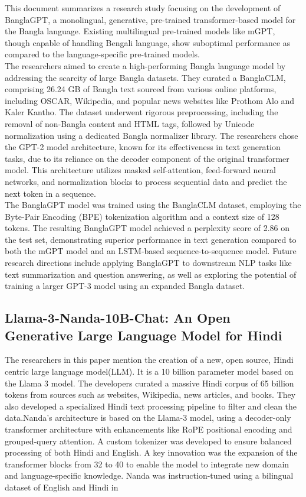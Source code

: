 This document summarizes a research study focusing on the development of BanglaGPT, a monolingual, generative, pre-trained transformer-based model for the Bangla language. Existing multilingual pre-trained models like mGPT, though capable of handling Bengali language, show suboptimal performance as compared to the language-specific pre-trained models.\\
\cite{BanglaGPT:1}The researchers aimed to create a high-performing Bangla language model by addressing the scarcity of large Bangla datasets. They curated a BanglaCLM, comprising 26.24 GB of Bangla text sourced from various online platforms, including OSCAR, Wikipedia, and popular news websites like Prothom Alo and Kaler Kantho. The dataset underwent rigorous preprocessing, including the removal of non-Bangla content and HTML tags, followed by Unicode normalization using a dedicated Bangla normalizer library.
The researchers chose the GPT-2 model architecture, known for its effectiveness in text generation tasks, due to its reliance on the decoder component of the original transformer model. This architecture utilizes masked self-attention, feed-forward neural networks, and normalization blocks to process sequential data and predict the next token in a sequence.\\
The BanglaGPT model was trained using the BanglaCLM dataset, employing the Byte-Pair Encoding (BPE) tokenization algorithm and a context size of 128 tokens. The resulting BanglaGPT model achieved a perplexity score of 2.86 on the test set, demonstrating superior performance in text generation compared to both the mGPT model and an LSTM-based sequence-to-sequence model. Future research directions include applying BanglaGPT to downstream NLP tasks like text summarization and question answering, as well as exploring the potential of training a larger GPT-3 model using an expanded Bangla dataset.

\subsection{Llama-3-Nanda-10B-Chat: An Open Generative Large Language Model for Hindi}

The researchers in this paper \cite{Llama3:1} mention the creation of a new, open source, Hindi centric large language model(LLM). It is a 10 billion parameter model based on the Llama 3 model. The developers curated a massive Hindi corpus of 65 billion tokens from sources such as websites, Wikipedia, news articles, and books. They also developed a specialized Hindi text processing pipeline to filter and clean the data.Nanda’s architecture is based on the Llama-3 model, using a decoder-only transformer architecture with enhancements like RoPE positional encoding and grouped-query attention. A custom tokenizer was developed to ensure balanced processing of both Hindi and English. A key innovation was the expansion of the transformer blocks from 32 to 40 to enable the model to integrate new domain and language-specific knowledge. Nanda was instruction-tuned using a bilingual dataset of English and Hindi in

\subsection{}